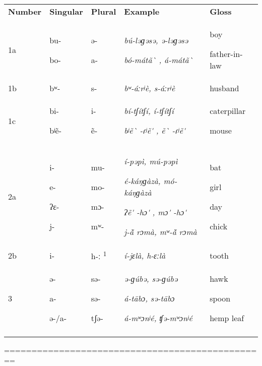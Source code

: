 \documentclass[output=paper]{langsci/langscibook}
\begin{document}
\begin{tabularx}{\textwidth}{XXXXX}
\lsptoprule
\textbf{Number} & \textbf{Singular} & \textbf{Plural} & \textbf{Example} & \textbf{Gloss}\\
1a & bu-

bo- & ə{}-

a- & \textit{bú-ləɡəsə, ə-ləɡəsə}

\textit{bó-mátã\`{} , á-mátã\`{} } & boy

father-in-law\\
1b & bʷ- & s- & \textit{bʷ-áːrʲè, s-áːrʲè} & husband\\
1c & bi-

bʲẽ- & i-

ẽ- & \textit{bí-tʃítʃí, í-tʃítʃí}

\textit{bʲẽ\`{} -ɾʲẽ\'{} , ẽ\`{} -ɾʲẽ\'{} } & caterpillar

mouse\\
2a & i-

e-

ʔɛ{}-

j- & mu-

mo- 

mɔ- 

mʷ- & \textit{í-pəpì, mú-pəpì} 

\textit{é-káŋɡàzà, mó-káŋɡàzà}

\textit{ʔẽ\'{} -hɔ\'{} , mɔ\'{} -hɔ\'{} } 

\textit{j-ã\v{} rɔmà, mʷ-ã\v{} rɔmà} & bat

girl

day

chick\\
2b & i- & h-ː \textsuperscript{1} & \textit{í-jɛlà, h-ɛːlà} & tooth\\
3 & ə{}-

a-

ə{}-/a- & sə- 

sə-

tʃə- & \textit{ə{}-ɡúbə, sə-ɡúbə} 

\textit{á-tābɔ, sə-tābɔ}

\textit{á-mʷɔnʲé, ʧə-mʷɔnʲé} & hawk 

spoon

hemp leaf\\
\lspbottomrule
\end{tabularx}
================================================
\end{document}

